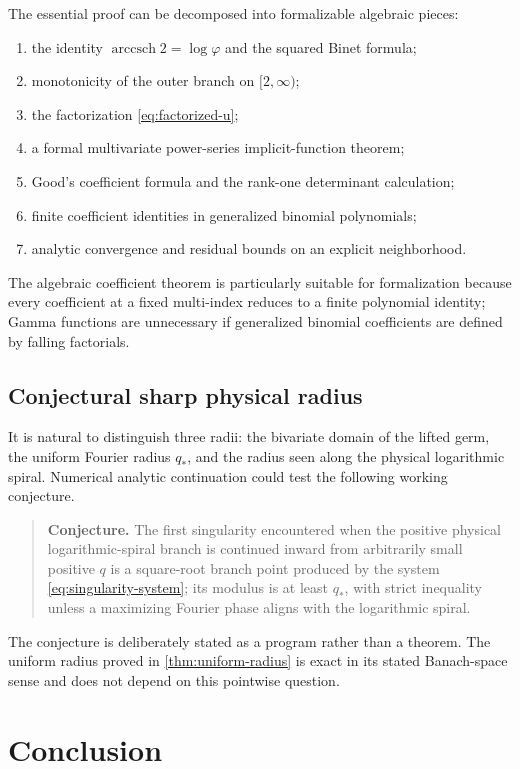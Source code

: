 \documentclass[11pt,oneside]{article}
\numberwithin{equation}{section}
\theoremstyle{plain}
\theoremstyle{definition}
\theoremstyle{remark}
\DeclareMathOperator{\arccsch}{arccsch}
\begin{document}
The essential proof can be decomposed into formalizable algebraic pieces:
\begin{enumerate}
\item the identity \(\arccsch2=\log\varphi\) and the squared Binet formula;
\item monotonicity of the outer branch on \([2,\infty)\);
\item the factorization \cref{eq:factorized-u};
\item a formal multivariate power-series implicit-function theorem;
\item Good's coefficient formula and the rank-one determinant calculation;
\item finite coefficient identities in generalized binomial polynomials;
\item analytic convergence and residual bounds on an explicit neighborhood.
\end{enumerate}
The algebraic coefficient theorem is particularly suitable for
formalization because every coefficient at a fixed multi-index reduces to a
finite polynomial identity; Gamma functions are unnecessary if generalized
binomial coefficients are defined by falling factorials.

\subsection{Conjectural sharp physical radius}

It is natural to distinguish three radii: the bivariate domain of the lifted
germ, the uniform Fourier radius \(q_*\), and the radius seen along the
physical logarithmic spiral.  Numerical analytic continuation could test
the following working conjecture.

\begin{quote}
\textbf{Conjecture.}
The first singularity encountered when the positive physical
logarithmic-spiral branch is continued inward from arbitrarily small
positive \(q\) is a square-root branch point produced by the system
\cref{eq:singularity-system}; its modulus is at least \(q_*\), with strict
inequality unless a maximizing Fourier phase aligns with the logarithmic
spiral.
\end{quote}

The conjecture is deliberately stated as a program rather than a theorem.
The uniform radius proved in \cref{thm:uniform-radius} is exact in its stated
Banach-space sense and does not depend on this pointwise question.
\section{Conclusion}
\end{document}
